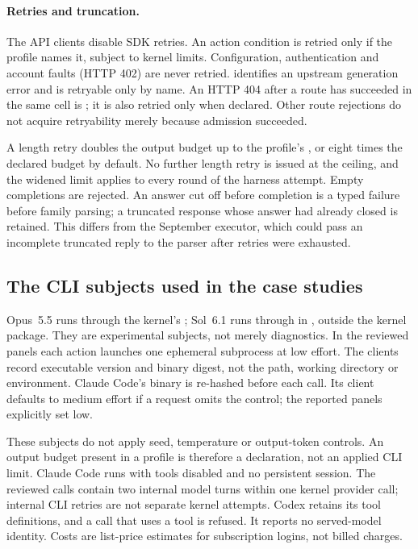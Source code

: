 \paragraph{Retries and truncation.}
The API clients disable SDK retries. An action condition is retried
only if the profile names it, subject to kernel limits. Configuration,
authentication and account faults (HTTP 402) are never retried.
 identifies an upstream generation error
and is retryable only by name. An HTTP 404 after a route has succeeded
in the same cell is ; it is
also retried only when declared. Other route rejections do not acquire
retryability merely because admission succeeded.

A length retry doubles the output budget up to the profile's
, or eight times the declared budget by
default. No further length retry is issued at the ceiling, and the
widened limit applies to every round of the harness attempt. Empty
completions are rejected. An answer cut off before completion is a
typed  failure before family parsing; a truncated response
whose answer had already closed is retained. This differs from the
September executor, which could pass an incomplete truncated reply to
the parser after retries were exhausted.

\subsection{The CLI subjects used in the case studies}
\label{app:runtime-cli}

Opus~5.5 runs through the kernel's ; Sol~6.1
runs through  in , outside
the kernel package. They are experimental subjects, not merely
diagnostics. In the reviewed panels each action launches one ephemeral
subprocess at low effort. The clients record executable version and
binary digest, not the path, working directory or environment. Claude
Code's binary is re-hashed before each call. Its client defaults to
medium effort if a request omits the control; the reported panels
explicitly set low.

These subjects do not apply seed, temperature or output-token controls.
An output budget present in a profile is therefore a declaration, not
an applied CLI limit. Claude Code runs with tools disabled and no
persistent session. The reviewed calls contain two internal model turns
within one kernel provider call; internal CLI retries are not separate
kernel attempts. Codex retains its tool definitions, and a call that
uses a tool is refused. It reports no served-model identity. Costs are
list-price estimates for subscription logins, not billed charges.

